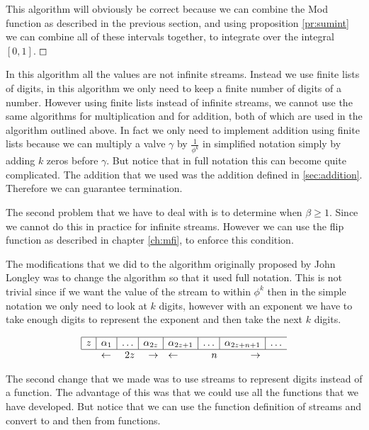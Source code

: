 \documentclass{cs4rep}
\begin{document}
This algorithm will obviously be correct because we can combine the
Mod function as described in the previous section, and using
proposition \ref{pr:sumint} we can combine all of these intervals
together, to integrate over the integral $[0,1]$.  \hfill $\boxempty$

In this algorithm all the values are not infinite streams. Instead we
use finite lists of digits, in this algorithm we only need to keep a
finite number of digits of a number. However using finite lists
instead of infinite streams, we cannot use the same algorithms for
multiplication and for addition, both of which are used in the
algorithm outlined above. In fact we only need to implement addition
using finite lists because we can multiply a valve $ \gamma $ by $
\frac{1}{\phi^{k}} $ in simplified notation simply by adding $ k $
zeros before $ \gamma $. But notice that in full notation this can
become quite complicated. The addition that we used was the addition
defined in \ref{sec:addition}. Therefore we can guarantee termination.

The second problem that we have to deal with is to determine when
$\beta \geq 1$. Since we cannot do this in practice for infinite
streams. However we can use the flip function as described in chapter
\ref{ch:mfi}, to enforce this condition.


The modifications that we did to the algorithm originally proposed by
John Longley was to change the algorithm so that it used full
notation. This is not trivial since if we want the value of the stream
to within $\phi^{k}$ then in the simple notation we only need to look
at $k$ digits, however with an exponent we have to take enough digits
to represent the exponent and then take the next $k$ digits.

\[ \begin{array}{|c|c|c|c|c|c|c|c}
\hline z & \alpha_{1} & \ldots & \alpha_{2z} & \alpha_{2z+1} & \ldots & \alpha_{2z+n+1} & \ldots \\
\hline \multicolumn{1}{c}{} & \multicolumn{3}{c}{\leftarrow \hfill 2z \hfill \rightarrow} & \multicolumn{3}{c}{\leftarrow \hfill n \hfill \rightarrow}
\end{array} \]



The second change that we made was to use streams to represent digits
instead of a function. The advantage of this was that we could use all
the functions that we have developed. But notice that we can use the
function definition of streams and convert to and then from functions.
\end{document}
